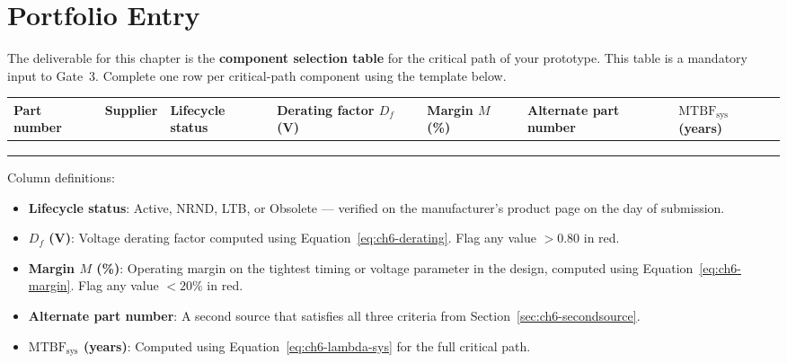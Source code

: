 \section*{Portfolio Entry}
\label{sec:ch6-artifact}

The deliverable for this chapter is the \textbf{component selection table} for the critical path of your prototype.
This table is a mandatory input to Gate~3.
Complete one row per critical-path component using the template below.

\begin{center}
\small
\begin{tabular}{p{2.0cm}p{2.2cm}p{1.5cm}p{1.1cm}p{1.5cm}p{2.2cm}p{1.8cm}}
  \hline
  \textbf{Part number} &
  \textbf{Supplier} &
  \textbf{Lifecycle status} &
  \textbf{Derating factor $D_f$ (V)} &
  \textbf{Margin $M$ (\%)} &
  \textbf{Alternate part number} &
  \textbf{$\mathrm{MTBF}_{\text{sys}}$ (years)} \\
  \hline
  & & & & & & \\
  & & & & & & \\
  & & & & & & \\
  \hline
\end{tabular}
\end{center}

Column definitions:
\begin{itemize}
  \item \textbf{Lifecycle status}: Active, NRND, LTB, or Obsolete --- verified on the manufacturer's product page on the day of submission.
  \item \textbf{$D_f$ (V)}: Voltage derating factor computed using Equation~\ref{eq:ch6-derating}. Flag any value $> 0.80$ in red.
  \item \textbf{Margin $M$ (\%)}: Operating margin on the tightest timing or voltage parameter in the design, computed using Equation~\ref{eq:ch6-margin}. Flag any value $< 20\%$ in red.
  \item \textbf{Alternate part number}: A second source that satisfies all three criteria from Section~\ref{sec:ch6-secondsource}.
  \item \textbf{$\mathrm{MTBF}_{\text{sys}}$ (years)}: Computed using Equation~\ref{eq:ch6-lambda-sys} for the full critical path.
\end{itemize}

